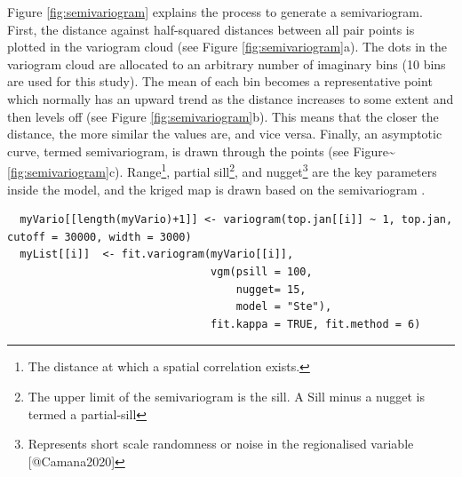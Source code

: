 Figure \ref{fig:semivariogram} explains the process to generate a
semivariogram. First, the distance against half-squared distances
between all pair points is plotted in the variogram cloud (see Figure
\ref{fig:semivariogram}a). The dots in the variogram cloud are allocated
to an arbitrary number of imaginary bins (10 bins are used for this
study). The mean of each bin becomes a representative point which
normally has an upward trend as the distance increases to some extent
and then levels off (see Figure \ref{fig:semivariogram}b). This means
that the closer the distance, the more similar the values are, and vice
versa. Finally, an asymptotic curve, termed semivariogram, is drawn
through the points (see
Figure\textasciitilde{}\ref{fig:semivariogram}c).
Range\footnote{The distance at which a spatial correlation exists.},
partial
sill\footnote{The upper limit of the semivariogram is the sill. A Sill minus a nugget is termed a partial-sill},
and
nugget\footnote{Represents short scale randomness or noise in the regionalised variable [@Camana2020]}
are the key parameters inside the model, and the kriged map is drawn
based on the semivariogram \citep{Law2019}.

\begin{verbatim}
  myVario[[length(myVario)+1]] <- variogram(top.jan[[i]] ~ 1, top.jan, cutoff = 30000, width = 3000)
  myList[[i]]  <- fit.variogram(myVario[[i]], 
                                vgm(psill = 100,
                                    nugget= 15,
                                    model = "Ste"),
                                fit.kappa = TRUE, fit.method = 6)
\end{verbatim}



\address{%
Hyesop Shin\\
MRC/CSO Social and Public Health Sciences Unit, University of Glasgow\\%
Berkeley Square, 99 Berkeley Street, Glasgow, G3 7HR\\
%
\url{https://www.gla.ac.uk/researchinstitutes/healthwellbeing/staff/hyesopshin/}\\%
%
\href{mailto:hyesop.shin@glasgow.ac.uk}{\nolinkurl{hyesop.shin@glasgow.ac.uk}}%
}
